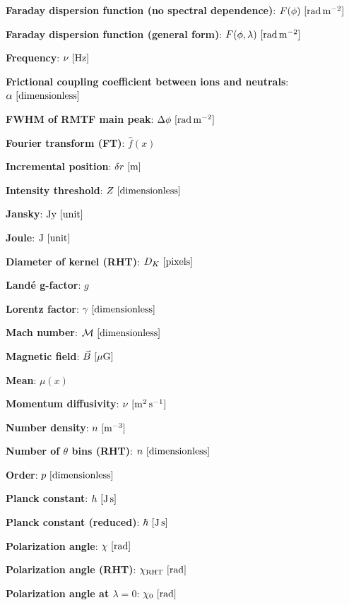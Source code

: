 \documentclass[a4paper,10pt]{article}
\begin{document}
{\noindent}\textbf{Faraday dispersion function (no spectral dependence)}: $F(\phi)~[{\rm rad\,m^{-2}}]$

{\noindent}\textbf{Faraday dispersion function (general form)}: $F(\phi,\lambda)~[{\rm rad\,m^{-2}}]$

{\noindent}\textbf{Frequency}: $\nu~[{\rm Hz}]$

{\noindent}\textbf{Frictional coupling coefficient between ions and neutrals}: $\alpha~[{\rm dimensionless}]$

{\noindent}\textbf{FWHM of RMTF main peak}: $\Delta\phi~[{\rm rad\,m^{-2}}]$

{\noindent}\textbf{Fourier transform (FT)}: $\hat{f}(x)$

{\noindent}\textbf{Incremental position}: $\delta r~[{\rm m}]$

{\noindent}\textbf{Intensity threshold}: $Z ~ [{\rm dimensionless}]$

{\noindent}\textbf{Jansky}: $\mathrm{Jy} ~ [\rm unit]$

{\noindent}\textbf{Joule}: $\mathrm{J} ~ [\rm unit]$

{\noindent}\textbf{Diameter of kernel (RHT)}: $D_K ~ [{\rm pixels}]$

{\noindent}\textbf{Land\'e g-factor}: $g$

{\noindent}\textbf{Lorentz factor}: $\gamma ~ [\rm dimensionless]$

{\noindent}\textbf{Mach number}: $\mathcal{M}~[{\rm dimensionless]}$

{\noindent}\textbf{Magnetic field}: $\vec{B}~[{\rm \mu G]}$

{\noindent}\textbf{Mean}: $\mu(x)$

{\noindent}\textbf{Momentum diffusivity}: $\nu ~ [{\rm m^2\,s^{-1}}]$

{\noindent}\textbf{Number density}: $n ~ [{\rm m^{-3}}]$

{\noindent}\textbf{Number of $\theta$ bins (RHT)}: $n ~ [{\rm dimensionless}]$

{\noindent}\textbf{Order}: $p~[{\rm dimensionless}]$

{\noindent}\textbf{Planck constant}: $h~[{\rm J\,s}]$

{\noindent}\textbf{Planck constant (reduced)}: $\hbar~[{\rm J\,s}]$

{\noindent}\textbf{Polarization angle}: $\chi~[{\rm rad}]$

{\noindent}\textbf{Polarization angle (RHT)}: $\chi_\mathrm{RHT} ~ [{\rm rad}]$

{\noindent}\textbf{Polarization angle at $\lambda=0$}: $\chi_0~[{\rm rad}]$
\end{document}
